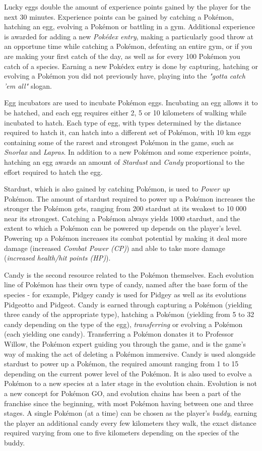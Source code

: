 Lucky eggs double the amount of experience points gained by the player for the next 30 minutes. Experience points can be gained by catching a Pokémon, hatching an egg, evolving a Pokémon or battling in a gym. Additional experience is awarded for adding a new \emph{Pokédex entry}, making a particularly good throw at an opportune time while catching a Pokémon, defeating an entire gym, or if you are making your first catch of the day, as well as for every 100 Pokémon you catch of a species. Earning a new Pokédex entry is done by capturing, hatching or evolving a Pokémon you did not previously have, playing into the \emph{"gotta catch 'em all"} slogan.

Egg incubators are used to incubate Pokémon eggs. Incubating an egg allows it to be hatched, and each egg requires either 2, 5 or 10 kilometers of walking while incubated to hatch. Each type of egg, with types determined by the distance required to hatch it, can hatch into a different set of Pokémon, with 10 km eggs containing some of the rarest and strongest Pokémon in the game, such as \emph{Snorlax} and \emph{Lapras}. In addition to a new Pokémon and some experience points, hatching an egg awards an amount of \emph{Stardust} and \emph{Candy} proportional to the effort required to hatch the egg.

Stardust, which is also gained by catching Pokémon, is used to \emph{Power up} Pokémon. The amount of stardust required to power up a Pokémon increases the stronger the Pokémon gets, ranging from 200 stardust at its weakest to 10 000 near its strongest. Catching a Pokémon always yields 1000 stardust, and the extent to which a Pokémon can be powered up depends on the player's level. Powering up a Pokémon increases its combat potential by making it deal more damage (increased \emph{Combat Power (CP)}) and able to take more damage (\emph{increased health/hit points (HP)}).

Candy is the second resource related to the Pokémon themselves. Each evolution line of Pokémon has their own type of candy, named after the base form of the species - for example, Pidgey candy is used for Pidgey as well as its evolutions Pidgeotto and Pidgeot. Candy is earned through capturing a Pokémon (yielding three candy of the appropriate type), hatching a Pokémon (yielding from 5 to 32 candy depending on the type of the egg), \emph{transferring} or evolving a Pokémon (each yielding one candy). Transferring a Pokémon donates it to Professor Willow, the Pokémon expert guiding you through the game, and is the game's way of making the act of deleting a Pokémon immersive. Candy is used alongside stardust to power up a Pokémon, the required amount ranging from 1 to 15 depending on the current power level of the Pokémon. It is also used to evolve a Pokémon to a new species at a later stage in the evolution chain. Evolution is not a new concept for Pokémon GO, and evolution chains has been a part of the franchise since the beginning, with most Pokémon having between one and three stages. A single Pokémon (at a time) can be chosen as the player's \emph{buddy}, earning the player an additional candy every few kilometers they walk, the exact distance required varying from one to five kilometers depending on the species of the buddy.

